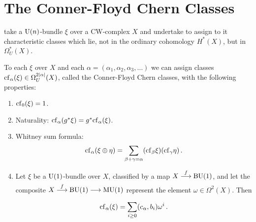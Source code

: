 \documentclass[../main]{subfiles}
\begin{document}
\chapter{The Conner-Floyd Chern Classes}
\label{sec:p1c4}

\cite{connerfloyd} take a $\mathrm{U}(n)$-bundle $\xi$ over a CW-complex $X$ and undertake to assign to it characteristic classes which lie, not in the ordinary cohomology $H^\ast(X)$, but in $\Omega_U^\ast(X)$.

\begin{theorem}
\label{thm:p1ch04.1}
To each $\xi$ over $X$ and each $\alpha = (\alpha_1, \alpha_2, \alpha_3, \ldots)$ we can assign classes $\mathrm{cf}_\alpha(\xi) \in \Omega_U^{2 \lvert\alpha\rvert}(X)$, called the Conner-Floyd Chern classes, with the following properties:
\begin{enumerate}[label=(\roman*)]
\item \label{li:p1ch04.1:i} $\mathrm{cf}_0(\xi) = 1$.
\item \label{li:p1ch04.1:ii} Naturality: $\mathrm{cf}_\alpha(g^\ast \xi) = g^\ast \mathrm{cf}_\alpha (\xi)$.
\item \label{li:p1ch04.1:iii} Whitney sum formula: 
\begin{equation*}
	\mathrm{cf}_\alpha(\xi \oplus \eta) = \sum_{\beta + \gamma = \alpha} (\mathrm{cf}_\beta \xi) (\mathrm{cf}_\gamma \eta)\,.
\end{equation*}
\item \label{li:p1ch04.1:iv} Let $\xi$ be a $\mathrm{U}(1)$-bundle over $X$, classified by a map $X \lar{f} \te{BU}(1)$, and let the composite $X \lar{f} \te{BU}(1) \lar{} \te{MU}(1)$ represent the element $\omega \in \Omega^2(X)$. 
Then
\begin{equation*}
	\mathrm{cf}_\alpha(\xi) = \sum_{i \geq 0} (c_\alpha, b_i) \omega^i \,.
\end{equation*}
\end{enumerate}
\end{theorem}
\end{document}
